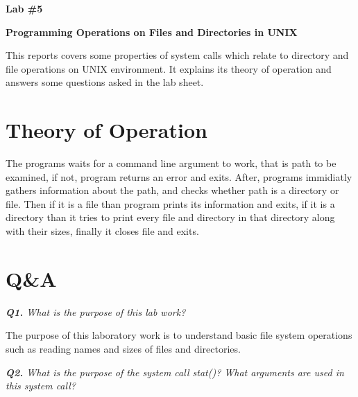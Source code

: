 \documentclass[11pt]{article}
\makeatletter
\renewenvironment{titlepage}
    {%
      \cleardoublepage
      \if@twocolumn
        \@restonecoltrue\onecolumn
      \else
        \@restonecolfalse\newpage
      \fi
      \thispagestyle{empty}%
    }%
    {\if@restonecol\twocolumn \else \newpage \fi
    }
\renewenvironment{titlepage}
    {%
      \cleardoublepage
      \if@twocolumn
        \@restonecoltrue\onecolumn
      \else
        \@restonecolfalse\newpage
      \fi
      \thispagestyle{empty}%
    }%
    {\if@restonecol\twocolumn \else \newpage \fi
     \if@twoside\else
     \fi
    }
\makeatother
\begin{document}
\begin{titlepage}
   \begin{center}
       \vspace*{5cm}
 
       \textbf{ \LARGE Lab \#5}
       
       \vspace{0.5cm}
 	\textbf{Programming Operations on Files and Directories in UNIX }
 	
       \vspace{0.5cm}

This reports covers some properties of system calls which relate to directory and file operations on UNIX environment. It explains its theory of operation and answers some questions asked in the lab sheet.
 
   \end{center}
\end{titlepage}



\section*{Theory of Operation}

The programs waits for a command line argument to work, that is path to be examined, if not, program returns an error and exits. After, programs immidiatly gathers information about the path, and checks whether path is a directory or file. Then if it is a file than program prints its information and exits, if it is a directory than it tries to print every file and directory in that directory along with their sizes, finally it closes file and exits.

\section*{Q\&A}

\vspace{3mm}
\textit{\textbf{Q1.} What is the purpose of this lab work?}
\vspace{3mm}

The purpose of this laboratory work is to understand basic file system operations such as reading names and sizes of files and directories.

\vspace{3mm}
\textit{\textbf{Q2.} What is the purpose of the system call stat()? What arguments are used in this system call?}
\vspace{3mm}
\end{document}
